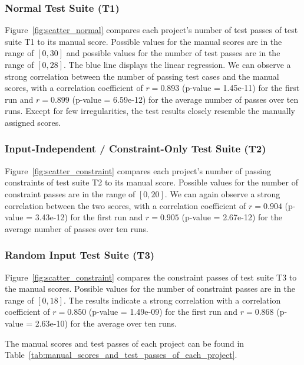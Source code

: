 \subsubsection{Normal Test Suite (T1)}

Figure~\ref{fig:scatter_normal} compares each project's number of test passes of test suite T1 to its manual score.
Possible values for the manual scores are in the range of $[0, 30]$ and possible values for the number of test passes are in the range of $[0, 28]$.
The blue line displays the linear regression.
We can observe a strong correlation between the number of passing test cases and the manual scores,
with a correlation coefficient of $r = 0.893$ (p-value = 1.45e-11) for the first run and $r = 0.899$ (p-value = 6.59e-12) for the average number of passes over ten runs.
Except for few irregularities, the test results closely resemble the manually assigned scores.

\subsubsection{Input-Independent / Constraint-Only Test Suite (T2)}

Figure~\ref{fig:scatter_constraint} compares each project's number of passing constraints of test suite T2 to its manual score.
Possible values for the number of constraint passes are in the range of $[0, 20]$.
We can again observe a strong correlation between the two scores,
with a correlation coefficient of $r = 0.904$ (p-value = 3.43e-12) for the first run and $r = 0.905$ (p-value = 2.67e-12) for the average number of passes over ten runs.

\subsubsection{Random Input Test Suite (T3)}

Figure~\ref{fig:scatter_constraint} compares the constraint passes of test suite T3 to the manual scores.
Possible values for the number of constraint passes are in the range of $[0, 18]$.
The results indicate a strong correlation with a correlation coefficient of $r = 0.850$ (p-value = 1.49e-09) for the first run and $r = 0.868$ (p-value = 2.63e-10) for the average over ten runs.
\parspace

\noindent The manual scores and test passes of each project can be found in Table~\ref{tab:manual_scores_and_test_passes_of_each_project}.

